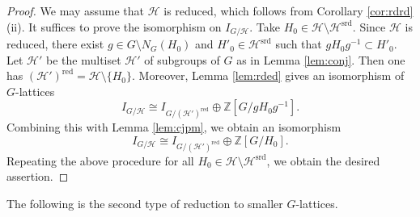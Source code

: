 \documentclass[12pt]{amsart}
\theoremstyle{plain}
\theoremstyle{definition}
\numberwithin{thm}{section}
\numberwithin{equation}{section}
\newcommand{\Z}{\mathbb{Z}}
\newcommand{\cH}{\mathcal{H}}
\DeclareMathOperator{\red}{red}
\DeclareMathOperator{\srd}{srd}
\begin{document}
\begin{proof}
We may assume that $\cH$ is reduced, which follows from Corollary \ref{cor:rdrd} (ii). 
It suffices to prove the isomorphism on $I_{G/\cH}$. 
Take $H_{0}\in \cH \setminus \cH^{\srd}$. Since $\cH$ is reduced, there exist $g\in G\setminus N_{G}(H_{0})$ and $H'_{0}\in \cH^{\srd}$ such that $gH_{0}g^{-1}\subset H'_{0}$. 
Let $\cH'$ be the multiset $\cH'$ of subgroups of $G$ as in Lemma \ref{lem:conj}. Then one has $(\cH')^{\red}=\cH \setminus \{H_{0}\}$. Moreover, Lemma \ref{lem:rded} gives an isomorphism of $G$-lattices
\begin{equation*}
I_{G/\cH}\cong I_{G/(\cH')^{\red}}\oplus \Z[G/gH_{0}g^{-1}]. 
\end{equation*}
Combining this with Lemma \ref{lem:cjpm}, we obtain an isomorphism
\begin{equation*}
I_{G/\cH}\cong I_{G/(\cH')^{\red}}\oplus \Z[G/H_{0}]. 
\end{equation*}
Repeating the above procedure for all $H_{0}\in \cH\setminus \cH^{\srd}$, we obtain the desired assertion. 
\end{proof}

The following is the second type of reduction to smaller $G$-lattices. 
\end{document}
